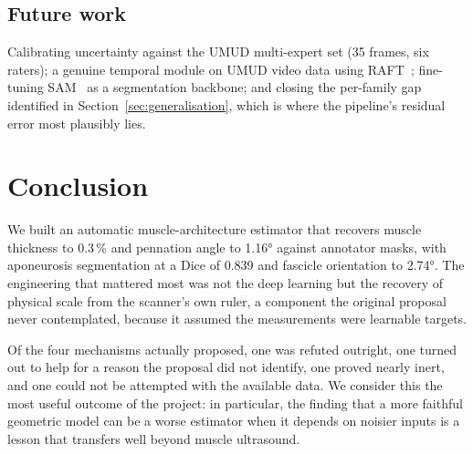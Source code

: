 \documentclass[11pt,a4paper]{article}
\begin{document}
\subsection{Future work}

Calibrating uncertainty against the UMUD multi-expert set (35 frames, six
raters); a genuine temporal module on UMUD video data using
RAFT~\citep{teed2020raft}; fine-tuning SAM~\citep{kirillov2023sam} as a
segmentation backbone; and closing the per-family gap identified in
Section~\ref{sec:generalisation}, which is where the pipeline's residual error
most plausibly lies.

\section{Conclusion}

We built an automatic muscle-architecture estimator that recovers muscle
thickness to 0.3\,\% and pennation angle to \ang{1.16} against annotator masks,
with aponeurosis segmentation at a Dice of 0.839 and fascicle orientation to
\ang{2.74}.
The engineering that mattered most was not the deep learning but the recovery of
physical scale from the scanner's own ruler, a component the original proposal
never contemplated, because it assumed the measurements were learnable targets.

Of the four mechanisms actually proposed, one was refuted outright, one turned
out to help for a reason the proposal did not identify, one proved nearly inert,
and one could not be attempted with the available data. We consider this the
most useful outcome of the project: in particular, the finding that a more
faithful geometric model can be a worse estimator when it depends on noisier
inputs is a lesson that transfers well beyond muscle ultrasound.



\end{document}
